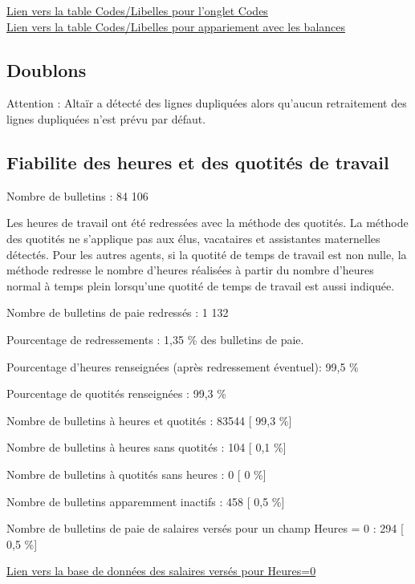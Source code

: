 \href{../Bases/Fiabilite/code.libelle.short.csv}{Lien vers la table
Codes/Libelles pour l'onglet Codes}\\
\href{../Bases/Fiabilite/code.libelle.csv}{Lien vers la table
Codes/Libelles pour appariement avec les balances}

\hypertarget{doublons}{%
\subsection{Doublons}\label{doublons}}

Attention : Altaïr a détecté des lignes dupliquées alors qu'aucun
retraitement des lignes dupliquées n'est prévu par défaut.

\hypertarget{fiabilite-des-heures-et-des-quotites-de-travail}{%
\subsection{Fiabilite des heures et des quotités de
travail}\label{fiabilite-des-heures-et-des-quotites-de-travail}}

Nombre de bulletins : 84 106

Les heures de travail ont été redressées avec la méthode des quotités.
La méthode des quotités ne s'applique pas aux élus, vacataires et
assistantes maternelles détectés. Pour les autres agents, si la quotité
de temps de travail est non nulle, la méthode redresse le nombre
d'heures réalisées à partir du nombre d'heures normal à temps plein
lorsqu'une quotité de temps de travail est aussi indiquée.

Nombre de bulletins de paie redressés : 1 132

Pourcentage de redressements : 1,35 \% des bulletins de paie.

Pourcentage d'heures renseignées (après redressement éventuel): 99,5 \%

Pourcentage de quotités renseignées : 99,3 \%

Nombre de bulletins à heures et quotités : 83544 {[} 99,3 \%{]}

Nombre de bulletins à heures sans quotités : 104 {[} 0,1 \%{]}

Nombre de bulletins à quotités sans heures : 0 {[} 0 \%{]}

Nombre de bulletins apparemment inactifs : 458 {[} 0,5 \%{]}

Nombre de bulletins de paie de salaires versés pour un champ Heures = 0
: 294 {[} 0,5 \%{]}

\href{../Bases/Fiabilite/base.heures.nulles.salaire.nonnull.csv}{Lien vers
la base de données des salaires versés pour Heures=0}


